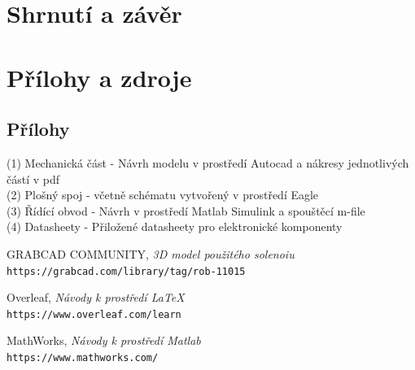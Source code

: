 \documentclass[12pt,oneside]{book} %
\begin{document}
\part{Shrnutí a závěr}\label{shrnuti}

\part{Přílohy a zdroje}\label{Pril_zdr}

\chapter{Přílohy}\label{Prilohy}

(1) Mechanická část - Návrh modelu v prostředí Autocad a nákresy jednotlivých částí v pdf\\
(2) Plošný spoj - včetně schématu vytvořený v prostředí Eagle\\
(3) Řídící obvod - Návrh v prostředí Matlab Simulink a spouštěcí m-file\\
(4) Datasheety - Přiložené datasheety pro elektronické komponenty\\


\begin{thebibliography}{9}

GRABCAD COMMUNITY,
\textit{3D model použitého solenoiu}
\\\texttt{https://grabcad.com/library/tag/rob-11015}

Overleaf,
\textit{Návody k prostředí \LaTeX\ }
\\\texttt{https://www.overleaf.com/learn}

MathWorks,
\textit{Návody k prostředí Matlab }
\\\texttt{https://www.mathworks.com/}

\end{thebibliography}
\end{document}
